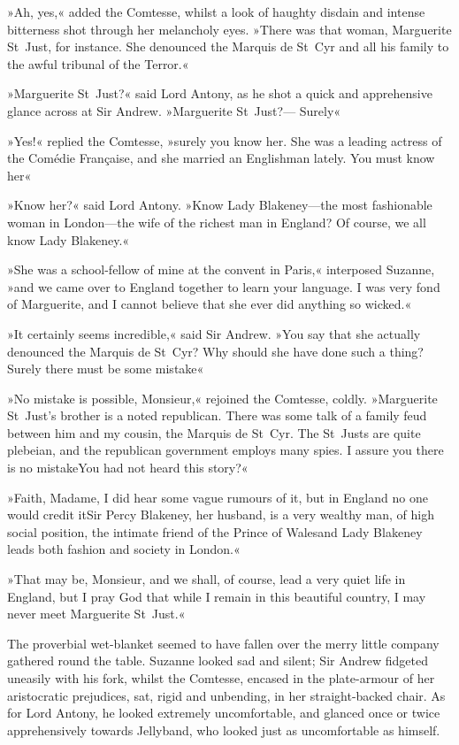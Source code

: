 »Ah, yes,« added the Comtesse, whilst a look of haughty disdain and intense bitterness shot through her melancholy eyes. »There was that woman, Marguerite St~Just, for instance. She denounced the Marquis de St~Cyr and all his family to the awful tribunal of the Terror.«

»Marguerite St~Just?« said Lord Antony, as he shot a quick and apprehensive glance across at Sir Andrew. »Marguerite St~Just?— Surely\textellipsis«

»Yes!« replied the Comtesse, »surely you know her. She was a leading actress of the Comédie Française, and she married an Englishman lately. You must know her\longdash«

»Know her?« said Lord Antony. »Know Lady Blakeney—the most fashionable woman in London—the wife of the richest man in England? Of course, we all know Lady Blakeney.«

»She was a school-fellow of mine at the convent in Paris,« interposed Suzanne, »and we came over to England together to learn your language. I was very fond of Marguerite, and I cannot believe that she ever did anything so wicked.«

»It certainly seems incredible,« said Sir Andrew. »You say that she actually denounced the Marquis de St~Cyr? Why should she have done such a thing? Surely there must be some mistake\longdash«

»No mistake is possible, Monsieur,« rejoined the Comtesse, coldly. »Marguerite St~Just's brother is a noted republican. There was some talk of a family feud between him and my cousin, the Marquis de St~Cyr. The St~Justs are quite plebeian, and the republican government employs many spies. I assure you there is no mistake\textellipsis \allowbreak  You had not heard this story?«

»Faith, Madame, I did hear some vague rumours of it, but in England no one would credit it\textellipsis \allowbreak  Sir Percy Blakeney, her husband, is a very wealthy man, of high social position, the intimate friend of the Prince of Wales\textellipsis \allowbreak  and Lady Blakeney leads both fashion and society in London.«

»That may be, Monsieur, and we shall, of course, lead a very quiet life in England, but I pray God that while I remain in this beautiful country, I may never meet Marguerite St~Just.«

The proverbial wet-blanket seemed to have fallen over the merry little company gathered round the table. Suzanne looked sad and silent; Sir Andrew fidgeted uneasily with his fork, whilst the Comtesse, encased in the plate-armour of her aristocratic prejudices, sat, rigid and unbending, in her straight-backed chair. As for Lord Antony, he looked extremely uncomfortable, and glanced once or twice apprehensively towards Jellyband, who looked just as uncomfortable as himself.

